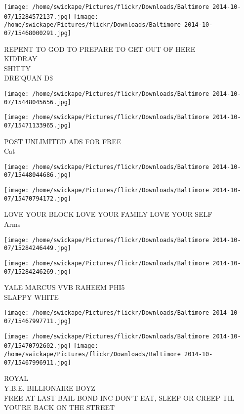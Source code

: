 \documentclass[10pt,letterpaper]{article}
\begin{document}
\texttt{[image: /home/swickape/Pictures/flickr/Downloads/Baltimore 2014-10-07/15284572137.jpg]}
\texttt{[image: /home/swickape/Pictures/flickr/Downloads/Baltimore 2014-10-07/15468000291.jpg]}

REPENT TO GOD TO PREPARE TO GET OUT OF HERE\\
KIDDRAY\\
SHITTY\\
DRE'QUAN D\$
\pagebreak

\texttt{[image: /home/swickape/Pictures/flickr/Downloads/Baltimore 2014-10-07/15448045656.jpg]}

\vspace{0.25in}
\texttt{[image: /home/swickape/Pictures/flickr/Downloads/Baltimore 2014-10-07/15471133965.jpg]}

POST UNLIMITED ADS FOR FREE\\
Cat
\pagebreak

\texttt{[image: /home/swickape/Pictures/flickr/Downloads/Baltimore 2014-10-07/15448044686.jpg]}

\vspace{0.25in}
\texttt{[image: /home/swickape/Pictures/flickr/Downloads/Baltimore 2014-10-07/15470794172.jpg]}

LOVE YOUR BLOCK LOVE YOUR FAMILY LOVE YOUR SELF\\
Arms
\pagebreak

\texttt{[image: /home/swickape/Pictures/flickr/Downloads/Baltimore 2014-10-07/15284246449.jpg]}

\vspace{0.25in}
\texttt{[image: /home/swickape/Pictures/flickr/Downloads/Baltimore 2014-10-07/15284246269.jpg]}

YALE MARCUS VVB RAHEEM PHI5\\
SLAPPY WHITE
\pagebreak

\texttt{[image: /home/swickape/Pictures/flickr/Downloads/Baltimore 2014-10-07/15467997711.jpg]}

\vspace{0.25in}
\texttt{[image: /home/swickape/Pictures/flickr/Downloads/Baltimore 2014-10-07/15470792602.jpg]}
\texttt{[image: /home/swickape/Pictures/flickr/Downloads/Baltimore 2014-10-07/15467996911.jpg]}

ROYAL\\
Y.B.E. BILLIONAIRE BOYZ\\
FREE AT LAST BAIL BOND INC DON'T EAT, SLEEP OR CREEP TIL YOU'RE BACK ON THE STREET
\pagebreak
\end{document}
